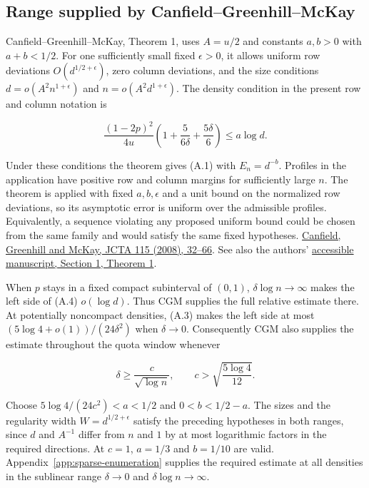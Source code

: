 \subsection{Range supplied by Canfield--Greenhill--McKay}

Canfield--Greenhill--McKay, Theorem 1, uses $A=u/2$ and constants $a,b>0$ with $a+b<1/2$. For one sufficiently small fixed $\epsilon>0$, it allows uniform row deviations $O(d^{1/2+\epsilon})$, zero column deviations, and the size conditions $d=o(A^2n^{1+\epsilon})$ and $n=o(A^2d^{1+\epsilon})$. The density condition in the present row and column notation is

\[
\frac{(1-2p)^2}{4u}
\left(1+\frac{5}{6\delta}+\frac{5\delta}{6}\right)
\le a\log d.
\tag{A.4}
\]

Under these conditions the theorem gives (A.1) with $E_n=d^{-b}$. Profiles in the application have positive row and column margins for sufficiently large $n$. The theorem is applied with fixed $a,b,\epsilon$ and a unit bound on the normalized row deviations, so its asymptotic error is uniform over the admissible profiles. Equivalently, a sequence violating any proposed uniform bound could be chosen from the same family and would satisfy the same fixed hypotheses. \href{https://doi.org/10.1016/j.jcta.2007.03.009}{Canfield, Greenhill and McKay, JCTA 115 (2008), 32--66}. See also the authors' \href{https://web.maths.unsw.edu.au/~csg/papers/CGM.pdf\#page=2}{accessible manuscript, Section 1, Theorem 1}.

When $p$ stays in a fixed compact subinterval of $(0,1)$, $\delta\log n\to\infty$ makes the left side of (A.4) $o(\log d)$. Thus CGM supplies the full relative estimate there. At potentially noncompact densities, (A.3) makes the left side at most $(5\log4+o(1))/(24\delta^2)$ when $\delta\to0$. Consequently CGM also supplies the estimate throughout the quota window whenever

\[
\delta\ge \frac{c}{\sqrt{\log n}},\qquad c>\sqrt{\frac{5\log4}{12}}.
\]

Choose $5\log4/(24c^2)<a<1/2$ and $0<b<1/2-a$. The sizes and the regularity width $W=d^{1/2+\epsilon}$ satisfy the preceding hypotheses in both ranges, since $d$ and $A^{-1}$ differ from $n$ and $1$ by at most logarithmic factors in the required directions. At $c=1$, $a=1/3$ and $b=1/10$ are valid. Appendix~\ref{app:sparse-enumeration} supplies the required estimate at all densities in the sublinear range $\delta\to0$ and $\delta\log n\to\infty$.
